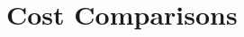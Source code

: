 \documentclass[thesis,proposal]{umassthesis}  %
\begin{document}
\section{Cost Comparisons}

\begin{figure}
	\begin{minipage}{0.49\textwidth}
        \label{Fig:275servercost}
    \end{minipage}
    \begin{minipage}{0.49\textwidth}

\end{minipage}
\end{figure}
\end{document}

